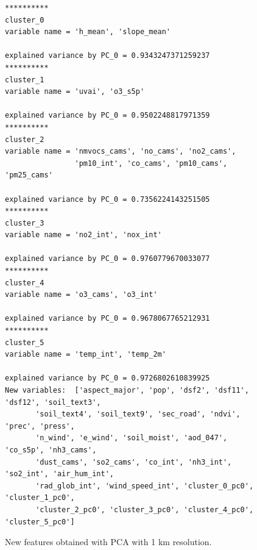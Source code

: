 \begin{figure}[H]
\begin{verbatim}
**********
cluster_0
variable name = 'h_mean', 'slope_mean'

explained variance by PC_0 = 0.9343247371259237
**********
cluster_1
variable name = 'uvai', 'o3_s5p'

explained variance by PC_0 = 0.9502248817971359
**********
cluster_2
variable name = 'nmvocs_cams', 'no_cams', 'no2_cams',
                'pm10_int', 'co_cams', 'pm10_cams', 'pm25_cams'

explained variance by PC_0 = 0.7356224143251505
**********
cluster_3
variable name = 'no2_int', 'nox_int'

explained variance by PC_0 = 0.9760779670033077
**********
cluster_4
variable name = 'o3_cams', 'o3_int'

explained variance by PC_0 = 0.9678067765212931
**********
cluster_5
variable name = 'temp_int', 'temp_2m'

explained variance by PC_0 = 0.9726802610839925
New variables:  ['aspect_major', 'pop', 'dsf2', 'dsf11', 'dsf12', 'soil_text3',
       'soil_text4', 'soil_text9', 'sec_road', 'ndvi', 'prec', 'press',
       'n_wind', 'e_wind', 'soil_moist', 'aod_047', 'co_s5p', 'nh3_cams',
       'dust_cams', 'so2_cams', 'co_int', 'nh3_int', 'so2_int', 'air_hum_int',
       'rad_glob_int', 'wind_speed_int', 'cluster_0_pc0', 'cluster_1_pc0',
       'cluster_2_pc0', 'cluster_3_pc0', 'cluster_4_pc0', 'cluster_5_pc0']
\end{verbatim}
\caption{New features obtained with PCA with 1 km resolution.}
\label{pca001}
\end{figure}
